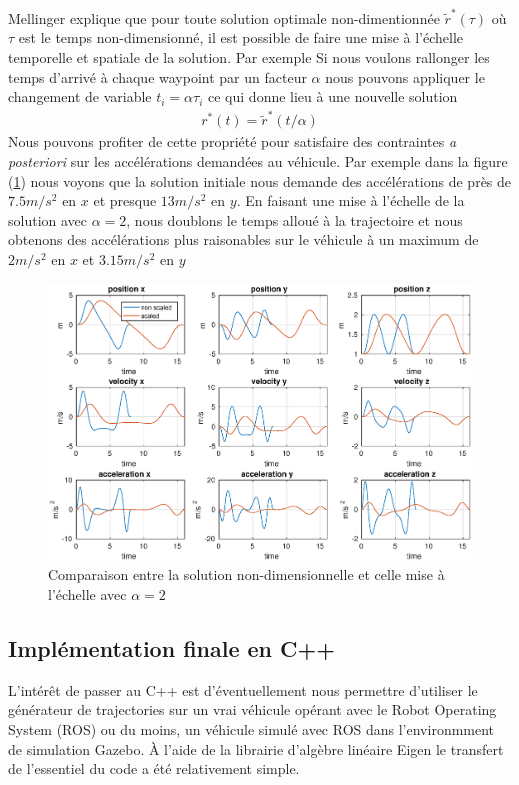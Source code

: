 Mellinger explique que pour toute solution optimale non-dimentionnée $\tilde{r}^*(\tau)$ où $\tau$ est le temps non-dimensionné, il est possible de faire une mise à l'échelle temporelle et spatiale de la solution. Par exemple Si nous voulons rallonger les temps d'arrivé à chaque waypoint par un facteur $\alpha$ nous pouvons appliquer le changement de variable $t_i = \alpha \tau_i$ ce qui donne lieu à une nouvelle solution
\begin{align*}
	r^*(t) = \tilde{r}^*(t/\alpha)
\end{align*}
Nous pouvons profiter de cette propriété pour satisfaire des contraintes \textit{a posteriori} sur les accélérations demandées au véhicule. Par exemple dans la figure (\ref{fig:comparaison_nondimensionalisation}) nous voyons que la solution initiale nous demande des accélérations de près de $7.5 m/s^2$ en $x$ et presque $13 m/s^2$ en $y$. En faisant une mise à l'échelle de la solution avec $\alpha = 2$, nous doublons le temps alloué à la trajectoire et nous obtenons des accélérations plus raisonables sur le véhicule à un maximum de $2 m/s^2$ en $x$ et $3.15 m/s^2$ en $y$

\begin{figure}[h]
  \centering
  \includegraphics[width=\textwidth ,trim=50 25 65 15, clip]{fig/figure8_derivatives}
  \caption{Comparaison entre la solution non-dimensionnelle et celle mise à l'échelle avec $\alpha = 2$}
  \label{fig:comparaison_nondimensionalisation}
\end{figure}

\subsection{Implémentation finale en C++}
L'intérêt de passer au C++ est d'éventuellement nous permettre d'utiliser le générateur de trajectories sur un vrai véhicule opérant avec le Robot Operating System (ROS) ou du moins, un véhicule simulé avec ROS dans l'environmment de simulation Gazebo. À l'aide de la librairie d'algèbre linéaire Eigen \cite{eigenweb} le transfert de l'essentiel du code a été relativement simple.

